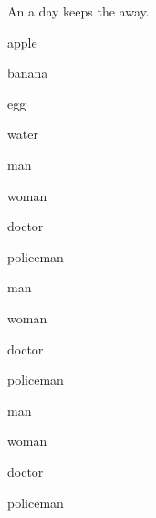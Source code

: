 \documentclass{exam-zh}
\begin{document}
An \fillin[apple] a day keeps the \fillin[doctor] away.

\begin{question}
  \begin{choices}
    \item apple
    \item banana
    \item egg
    \item water
  \end{choices}
\end{question}

\begin{question}
  \begin{choices}
    \item man
    \item woman
    \item doctor
    \item policeman
  \end{choices}
\end{question}

\begin{question}
  \begin{choices}
    \item man
    \item woman
    \item doctor
    \item policeman
  \end{choices}
\end{question}

\begin{question}
  \begin{choices}
    \item man
    \item woman
    \item doctor
    \item policeman
  \end{choices}
\end{question}
\end{document}
